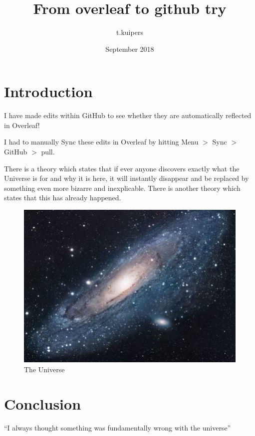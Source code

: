 \documentclass{article}
\title{From overleaf to github try}
\author{t.kuipers }
\date{September 2018}
\begin{document}
\maketitle

\section{Introduction}
I have made edits within GitHub to see whether they are automatically reflected in Overleaf!

I had to manually Sync these edits in Overleaf by hitting Menu $>$ Sync $>$ GitHub $>$ pull.

There is a theory which states that if ever anyone discovers exactly what the Universe is for and why it is here, it will instantly disappear and be replaced by something even more bizarre and inexplicable.
There is another theory which states that this has already happened.

\begin{figure}[h!]
\centering
\includegraphics[scale=1.7]{universe}
\caption{The Universe}
\label{fig:universe}
\end{figure}

\section{Conclusion}
``I always thought something was fundamentally wrong with the universe'' \citep{adams1995hitchhiker}



\end{document}
